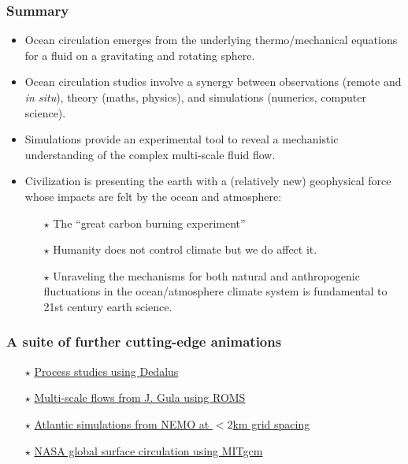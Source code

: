 \documentclass[10pt]{beamer}
\begin{document}
\begin{frame}
  \frametitle{Summary}

\begin{exampleblock}{}

\begin{itemize}

\item Ocean circulation emerges from the underlying thermo/mechanical
  equations for a fluid on a gravitating and rotating sphere.

\item Ocean circulation studies involve a synergy between observations
  (remote and {\it in situ}), theory (maths, physics), and
  simulations (numerics, computer science).

\item Simulations provide an experimental tool to reveal a mechanistic
  understanding of the complex multi-scale fluid flow.

\item Civilization is presenting the earth with a (relatively new)
  geophysical force whose impacts are felt by the ocean and
  atmosphere: 
   \begin{itemize}
   \item[$\star$]  The ``great carbon burning experiment'' 
   \item[$\star$] Humanity does not control climate but we do affect
     it.
   \item[$\star$] Unraveling the mechanisms for both natural and
     anthropogenic fluctuations in the ocean/atmosphere climate system
     is fundamental to 21st century earth science.
  \end{itemize}
 
\end{itemize}


\end{exampleblock}{}

\end{frame}



\begin{frame}
  \frametitle{A suite of further cutting-edge animations}

\begin{itemize} 

\item[$\star$] 
\href{https://vimeo.com/dedalus}{Process studies using Dedalus}

\item[$\star$] 
\href{http://stockage.univ-brest.fr/~gula/movies.html}{Multi-scale flows from J. Gula using ROMS}

\item[$\star$] 
\href{https://vimeo.com/oceannext}{Atlantic simulations from NEMO at $<2$km grid spacing}

\item[$\star$] 
\href{https://www.youtube.com/watch?v=CCmTY0PKGDs}{NASA global surface circulation using MITgcm}


\end{itemize}

\end{frame}
\end{document}
